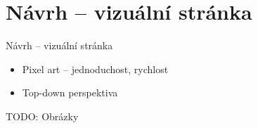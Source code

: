 \documentclass[10pt]{beamer}
\begin{document}
	\begin{frame}[plain]
	\end{frame}
	
	\begin{frame}[plain]
	\end{frame}
	
	\section{Návrh – vizuální stránka}
	\begin{frame}{Návrh – vizuální stránka}
		\begin{itemize}\setlength\itemsep{10pt}
			\item Pixel art – jednoduchost, rychlost
			\item Top-down perspektiva
		\end{itemize}
		TODO: Obrázky
	\end{frame}
	
\end{document}
